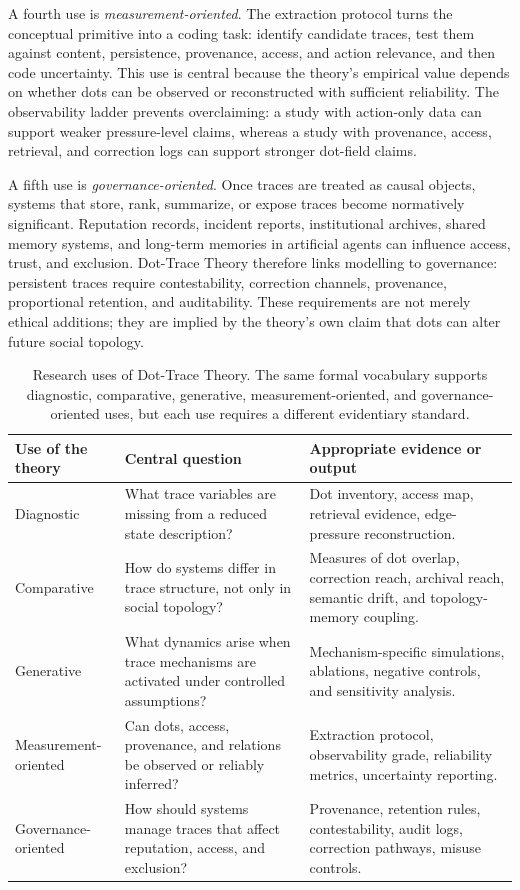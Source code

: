 \documentclass[11pt]{article}
\theoremstyle{remark}
\begin{document}
A fourth use is \emph{measurement-oriented}. The extraction protocol turns the conceptual primitive into a coding task: identify candidate traces, test them against content, persistence, provenance, access, and action relevance, and then code uncertainty. This use is central because the theory's empirical value depends on whether dots can be observed or reconstructed with sufficient reliability. The observability ladder prevents overclaiming: a study with action-only data can support weaker pressure-level claims, whereas a study with provenance, access, retrieval, and correction logs can support stronger dot-field claims.

A fifth use is \emph{governance-oriented}. Once traces are treated as causal objects, systems that store, rank, summarize, or expose traces become normatively significant. Reputation records, incident reports, institutional archives, shared memory systems, and long-term memories in artificial agents can influence access, trust, and exclusion. Dot-Trace Theory therefore links modelling to governance: persistent traces require contestability, correction channels, provenance, proportional retention, and auditability. These requirements are not merely ethical additions; they are implied by the theory's own claim that dots can alter future social topology.

\begin{table}[htbp]
\centering
\small
\renewcommand{\arraystretch}{1.25}
\begin{tabular}{L{0.20\textwidth}L{0.32\textwidth}L{0.34\textwidth}}
\toprule
Use of the theory & Central question & Appropriate evidence or output\\
\midrule
Diagnostic & What trace variables are missing from a reduced state description? & Dot inventory, access map, retrieval evidence, edge-pressure reconstruction.\\
Comparative & How do systems differ in trace structure, not only in social topology? & Measures of dot overlap, correction reach, archival reach, semantic drift, and topology-memory coupling.\\
Generative & What dynamics arise when trace mechanisms are activated under controlled assumptions? & Mechanism-specific simulations, ablations, negative controls, and sensitivity analysis.\\
Measurement-oriented & Can dots, access, provenance, and relations be observed or reliably inferred? & Extraction protocol, observability grade, reliability metrics, uncertainty reporting.\\
Governance-oriented & How should systems manage traces that affect reputation, access, and exclusion? & Provenance, retention rules, contestability, audit logs, correction pathways, misuse controls.\\
\bottomrule
\end{tabular}
\caption{Research uses of Dot-Trace Theory. The same formal vocabulary supports diagnostic, comparative, generative, measurement-oriented, and governance-oriented uses, but each use requires a different evidentiary standard.}
\label{tab:research-uses-integration}
\end{table}
\end{document}
